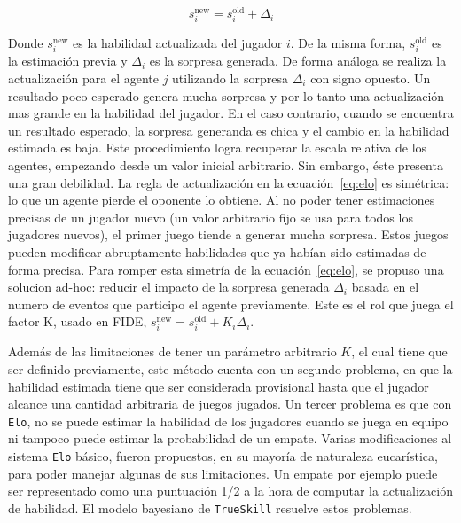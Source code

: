 \documentclass[11pt,twoside,spanish]{report} %
\begin{document}
\begin{equation}\label{eq:elo}
s_i^{\text{new}} = s_i^{\text{old}} + \Delta_i
\end{equation}

Donde $s_i^{\text{new}}$ es la habilidad actualizada del jugador $i$.
De la misma forma,  $s_i^{\text{old}}$ es la estimaci\'on previa y  $\Delta_i$ es la sorpresa generada.
De forma an\'aloga se realiza la actualizaci\'on para el agente $j$ utilizando la sorpresa $\Delta_i$ con signo opuesto.
Un resultado poco esperado genera mucha sorpresa y por lo tanto una actualizaci\'on mas grande en la habilidad del jugador.
En el caso contrario, cuando se encuentra un resultado esperado, la sorpresa generanda es chica y el cambio en la habilidad estimada es baja.
Este procedimiento logra recuperar la escala relativa de los agentes, empezando desde un valor inicial arbitrario.
Sin embargo, \'este presenta una gran debilidad.
La regla de actualizaci\'on en la ecuaci\'on~\ref{eq:elo} es sim\'etrica: lo que un agente pierde el oponente lo obtiene.
Al no poder tener estimaciones precisas de un jugador nuevo (un valor arbitrario fijo se usa para todos los jugadores nuevos), el primer juego tiende a generar mucha sorpresa.
Estos juegos pueden modificar abruptamente habilidades que ya hab\'ian sido estimadas de forma precisa.
Para romper esta simetr\'ia de la ecuaci\'on~\ref{eq:elo}, se propuso una solucion ad-hoc: reducir el impacto de la sorpresa generada $\Delta_i$ basada en el numero de eventos que participo el agente previamente.
Este es el rol que juega el factor K, usado en FIDE, $s_i^{\text{new}} = s_i^{\text{old}} + K_i\Delta_i$.


Adem\'as de las limitaciones de tener un par\'ametro arbitrario $K$, el cual tiene que ser definido previamente, este m\'etodo cuenta con un segundo problema, en que la habilidad estimada tiene que ser considerada provisional hasta que el jugador alcance una cantidad arbitraria de juegos jugados.
Un tercer problema es que con \texttt{Elo}, no se puede estimar la habilidad de los jugadores cuando se juega en equipo ni tampoco puede estimar la probabilidad de un empate.
Varias modificaciones al sistema \texttt{Elo} b\'asico, fueron propuestos, en su mayor\'ia de naturaleza eucar\'istica, para poder manejar algunas de sus limitaciones.
Un empate por ejemplo puede ser representado como una puntuaci\'on 1/2 a la hora de computar la actualizaci\'on de habilidad.
El modelo bayesiano de \texttt{TrueSkill} resuelve estos problemas.
\end{document}
